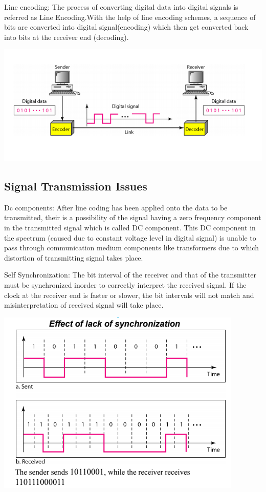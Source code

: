 \documentclass[10pt,journal,compsoc]{IEEEtran}
\begin{document}
Line encoding: The process of converting digital data into digital signals is referred as Line Encoding.With the help of line encoding schemes, a sequence of bits are converted into digital signal(encoding) which then get converted back into bits at the receiver end (decoding).

\includegraphics[scale=0.37]{figures/intro1.png}

\subsection{Signal Transmission Issues}
Dc components: After line coding has been applied onto the data to be transmitted, their is a possibility of the signal having a zero frequency component in the transmitted signal which is called DC component. This DC component in the spectrum (caused due to constant voltage level in digital signal) is unable to pass through communication medium components like transformers due to which distortion of transmitting signal takes place.


Self Synchronization: The bit interval of the receiver and that of the transmitter must be synchronized  inorder to correctly interpret the received signal. If the clock at the receiver end is faster or slower, the bit intervals will not match and misinterpretation of received signal will take place.


\includegraphics[scale=0.5]{figures/intro2.png}
\end{document}
